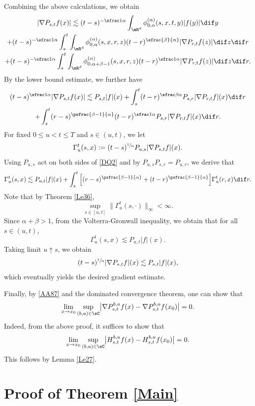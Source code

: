 \step\label{Step 5}
Combining the above calculations, we obtain \label{USE_THM_4.3}\vspace*{-5pt}
\begin{multline*}
|\nabla P_{s,t} f(x)|\lesssim(t-s)^{-\sfrac1\alpha}\int_{\mR^d}\phi^{(\alpha)}_{0,\alpha}(s,x,t,y)|f(y)|\dif y\\[-1pt]
+(t-s)^{-\sfrac1\alpha}\int^t_s\int_{\mR^d}\phi^{(\alpha)}_{0,\alpha}(s,x,r,z)(t-r)^{\sfrac{\beta}{\alpha}}|\nabla P_{r,t}f(z)|\dif z\dif r\\[-1pt]
+(t-s)^{-\sfrac1\alpha}\int^t_s\int_{\mR^d}\phi^{(\alpha)}_{0,\alpha+\beta-1}(s,x,r,z)(t-r)^{\sfrac1\alpha}|\nabla P_{r,t}f(z)|\dif z\dif r.
\end{multline*}
By the lower bound estimate, we further have\vspace*{-3pt}
\begin{multline}\label{DQ2}
(t-s)^{\sfrac1\alpha}|\nabla P_{s,t} f(x)|\lesssim P_{s,t}|f|(x)+\int^t_s(t-r)^{\sfrac\beta\alpha}P_{s,r}|\nabla P_{r,t}f|(x)\dif r\\
+\int^t_s(r-s)^{\psfrac{\beta-1}{\alpha}}(t-r)^{\sfrac1\alpha}P_{s,r}|\nabla P_{r,t}f|(x)\dif r.
\end{multline}
For fixed $0\leq u<t\leq T$ and $s\in(u,t)$, we let
\[
\Gamma^t_u(s,x):=(t-s)^{\sfrac1\alpha}P_{u,s}|\nabla P_{s,t}f|(x).
\]
Using $P_{u,s}$ act on both sides of \eqref{DQ2} and by $P_{u,s}P_{s,r}=P_{u,r}$, we derive that
\begin{equation*}
\Gamma^t_u(s,x)\lesssim P_{u,t}|f|(x)
+\int^t_s\Big[(r-s)^{\psfrac{\beta-1}{\alpha}}+(t-r)^{\psfrac{\beta-1}{\alpha}}\Big]\Gamma^t_u(r,x)\dif r.
\end{equation*}
Note that by Theorem \ref{Le36},
\[
\sup_{s\in[u,t]}\|\Gamma^t_u(s,\cdot)\|_\infty<\infty.
\]
Since $\alpha+\beta>1$, from the Volterra-Gronwall inequality, we obtain that for all $s\in(u,t)$,
\[
\Gamma^t_u(s,x)\lesssim P_{u,t}|f|(x).
\]
Taking limit $u\uparrow s$, we obtain
\[
(t-s)^{\sfrac1\alpha}|\nabla P_{s,t}f|(x)\lesssim P_{s,t}|f|(x),
\]
which eventually yields the desired gradient estimate.

\step\label{Step 6}
Finally, by \eqref{AA87} and the dominated convergence theorem, one can show that
\[
\lim_{x\to x_0}\sup_{(b,a)\in\sC}\bigl|\nabla P^{b,a}_{s,t}f(x)-\nabla P^{b,a}_{s,t}f(x_0)\bigr|=0.
\]
Indeed, from the above proof, it suffices to show that
\[
\lim_{x\to x_0}\sup_{(b,a)\in\sC}\bigl|H^{b,a}_{s,t}f(x)-H^{b,a}_{s,t}f(x_0)\bigr|=0.
\]
This follows by Lemma \ref{Le27}.

\section{Proof of Theorem \ref{Main}}
\label{FINAL_SEC}

